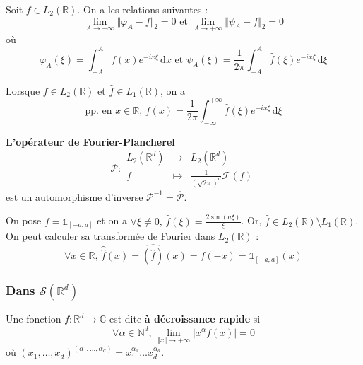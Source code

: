 	\begin{proposition}
		Soit $f \in L_2(\mathbb{R})$. On a les relations suivantes :
		\[ \lim_{A \rightarrow +\infty} \Vert \varphi_A - f \Vert_2 = 0 \text{ et } \lim_{A \rightarrow +\infty} \Vert \psi_A - f \Vert_2 = 0 \]
		où
		\[ \varphi_A(\xi) = \int_{-A}^{A} f(x) e^{-ix\xi} \, \mathrm{d}x \text{ et } \psi_A(\xi) = \frac{1}{2 \pi} \int_{-A}^{A} \widehat{f}(\xi) e^{-ix\xi} \, \mathrm{d}\xi \]
	\end{proposition}

	\begin{corollary}
		Lorsque $f \in L_2(\mathbb{R})$ et $\widehat{f} \in L_1(\mathbb{R})$, on a
		\[ \text{pp. en } x \in \mathbb{R}, \, f(x) = \frac{1}{2 \pi} \int_{-\infty}^{+\infty} \widehat{f}(\xi) e^{-ix\xi} \, \mathrm{d}\xi \]
	\end{corollary}

	\begin{theorem}
		\textbf{L'opérateur de Fourier-Plancherel}
		\[
		\mathcal{P} :
		\begin{array}{ccc}
			L_2(\mathbb{R}^d) &\rightarrow& L_2(\mathbb{R}^d) \\
			f &\mapsto& \frac{1}{(\sqrt{2 \pi})^d} \mathcal{F}(f)
		\end{array}
		\]
		est un automorphisme d'inverse $\mathcal{P}^{-1} = \overline{\mathcal{P}}$.
	\end{theorem}


	\begin{example}
		On pose $f = \mathbb{1}_{[-a, a]}$ et on a $\forall \xi \neq 0, \, \widehat{f}(\xi) = \frac{2 \sin(a\xi)}{\xi}$. Or, $\widehat{f} \in L_2(\mathbb{R}) \setminus L_1(\mathbb{R})$. On peut calculer sa transformée de Fourier dans $L_2(\mathbb{R})$ :
		\[ \forall x \in \mathbb{R}, \, \widehat{\widehat{f}}(x) = \widehat{(\widehat{f})}(x) = f(-x) = \mathbb{1}_{[-a, a]}(x) \]
	\end{example}

	\subsubsection{Dans \texorpdfstring{$\mathcal{S}(\mathbb{R}^d)$}{S(Rᵈ)}}


	\begin{definition}
		Une fonction $f : \mathbb{R}^d \rightarrow \mathbb{C}$ est dite \textbf{à décroissance rapide} si
		\[ \forall \alpha \in \mathbb{N}^d, \, \lim_{\Vert x \Vert \rightarrow +\infty} \vert x^\alpha f(x) \vert = 0 \]
		où $(x_1, \dots, x_d)^{(\alpha_1, \dots, \alpha_d)} = x_1^{\alpha_1} \dots x_d^{\alpha_d}$.
	\end{definition}

